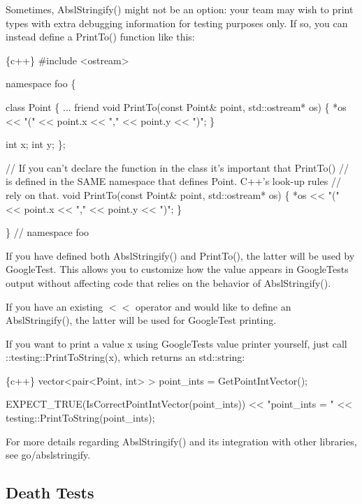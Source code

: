 Sometimes, {\ttfamily Absl\+Stringify()} might not be an option\+: your team may wish to print types with extra debugging information for testing purposes only. If so, you can instead define a {\ttfamily Print\+To()} function like this\+:


\begin{DoxyCode}
\{c++\}
#include <ostream>

namespace foo \{

class Point \{
  ...
  friend void PrintTo(const Point& point, std::ostream* os) \{
    *os << "(" << point.x << "," << point.y << ")";
  \}

  int x;
  int y;
\};

// If you can't declare the function in the class it's important that PrintTo()
// is defined in the SAME namespace that defines Point.  C++'s look-up rules
// rely on that.
void PrintTo(const Point& point, std::ostream* os) \{
    *os << "(" << point.x << "," << point.y << ")";
\}

\}  // namespace foo
\end{DoxyCode}


If you have defined both {\ttfamily Absl\+Stringify()} and {\ttfamily Print\+To()}, the latter will be used by Google\+Test. This allows you to customize how the value appears in Google\+Test\textquotesingle{}s output without affecting code that relies on the behavior of {\ttfamily Absl\+Stringify()}.

If you have an existing {\ttfamily $<$$<$} operator and would like to define an {\ttfamily Absl\+Stringify()}, the latter will be used for Google\+Test printing.

If you want to print a value {\ttfamily x} using Google\+Test\textquotesingle{}s value printer yourself, just call {\ttfamily \+::testing\+::\+Print\+To\+String(x)}, which returns an {\ttfamily std\+::string}\+:


\begin{DoxyCode}
\{c++\}
vector<pair<Point, int> > point\_ints = GetPointIntVector();

EXPECT\_TRUE(IsCorrectPointIntVector(point\_ints))
    << "point\_ints = " << testing::PrintToString(point\_ints);
\end{DoxyCode}


For more details regarding {\ttfamily Absl\+Stringify()} and its integration with other libraries, see go/abslstringify.

\subsection*{Death Tests}

